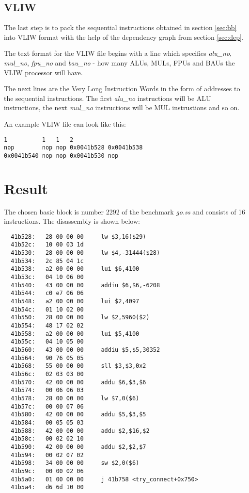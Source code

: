 \documentclass[titlepage, a4paper]{article}
\begin{document}
\subsection{VLIW}
The last step is to pack the sequential instructions obtained in section \ref{sec:bb} into VLIW format with the help of the dependency graph from section \ref{sec:dep}.

The text format for the VLIW file begins with a line which specifies \textit{alu\_no}, \textit{mul\_no}, \textit{fpu\_no} and \textit{bau\_no} - how many ALUs, MULs, FPUs and BAUs the VLIW processor will have.

The next lines are the Very Long Instruction Words in the form of addresses to the sequential instructions. The first \textit{alu\_no} instructions will be ALU instructions, the next \textit{mul\_no} instructions will be MUL instrustions and so on.

An example VLIW file can look like this:

\begin{lstlisting}
1          1   1   2
nop        nop nop 0x0041b528 0x0041b538
0x0041b540 nop nop 0x0041b530 nop
\end{lstlisting}

\section{Result}
The chosen basic block is number 2292 of the benchmark \textit{go.ss} and consists of 16 instructions. The disassembly is shown below:

\begin{lstlisting}
  41b528:	28 00 00 00 	lw $3,16($29)
  41b52c:	10 00 03 1d 
  41b530:	28 00 00 00 	lw $4,-31444($28)
  41b534:	2c 85 04 1c 
  41b538:	a2 00 00 00 	lui $6,4100
  41b53c:	04 10 06 00 
  41b540:	43 00 00 00 	addiu $6,$6,-6208
  41b544:	c0 e7 06 06 
  41b548:	a2 00 00 00 	lui $2,4097
  41b54c:	01 10 02 00 
  41b550:	28 00 00 00 	lw $2,5960($2)
  41b554:	48 17 02 02 
  41b558:	a2 00 00 00 	lui $5,4100
  41b55c:	04 10 05 00 
  41b560:	43 00 00 00 	addiu $5,$5,30352
  41b564:	90 76 05 05 
  41b568:	55 00 00 00 	sll $3,$3,0x2
  41b56c:	02 03 03 00 
  41b570:	42 00 00 00 	addu $6,$3,$6
  41b574:	00 06 06 03 
  41b578:	28 00 00 00 	lw $7,0($6)
  41b57c:	00 00 07 06 
  41b580:	42 00 00 00 	addu $5,$3,$5
  41b584:	00 05 05 03 
  41b588:	42 00 00 00 	addu $2,$16,$2
  41b58c:	00 02 02 10 
  41b590:	42 00 00 00 	addu $2,$2,$7
  41b594:	00 02 07 02 
  41b598:	34 00 00 00 	sw $2,0($6)
  41b59c:	00 00 02 06 
  41b5a0:	01 00 00 00 	j 41b758 <try_connect+0x750>
  41b5a4:	d6 6d 10 00 
\end{lstlisting}
\end{document}
